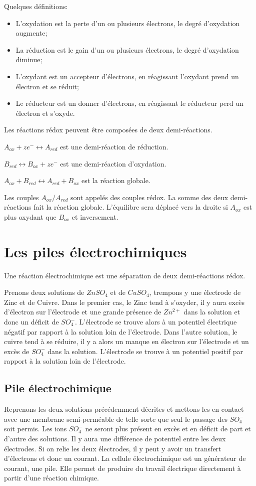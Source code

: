 Quelques définitions:

\begin{itemize}
  \item L'oxydation est la perte d'un ou plusieurs électrons,
    le degré d'oxydation augmente;
  \item La réduction est le gain d'un ou plusieurs électrons,
    le degré d'oxydation diminue;
  \item L'oxydant est un accepteur d'électrons,
    en réagissant l'oxydant prend un électron et se réduit;
  \item Le réducteur est un donner d'électrons,
    en réagissant le réducteur perd un électron et s'oxyde.
\end{itemize}

Les réactions rédox peuvent être composées de deux demi-réactions.

$A_{ox}+ze^- \leftrightarrow A_{red}$ est une demi-réaction de réduction.

$B_{red} \leftrightarrow B_{ox}+ze^-$ est une demi-réaction d'oxydation.

$A_{ox}+B_{red}\leftrightarrow A_{red}+B_{ox}$ est la réaction globale.

Les couples $A_{ox}/A_{red}$ sont appelés des couples rédox.
La somme des deux demi-réactions fait la réaction globale.
L'équilibre sera déplacé vers la droite si $A_{ox}$ est
plus oxydant que $B_{ox}$ et inversement.

\section{Les piles électrochimiques}
Une réaction électrochimique est une séparation de deux demi-réactions rédox.

Prenons deux solutions de $ZnSO_4$ et de $CuSO_4$,
trempons y une électrode de Zinc et de Cuivre.
Dans le premier cas, le Zinc tend à s'oxyder,
il y aura excès d'électron sur l'électrode et une grande présence de $Zn^{2+}$
dans la solution et donc un déficit de $SO_4^-$.
L'électrode se trouve alors à un potentiel électrique négatif
par rapport à la solution loin de l'électrode.
Dans l'autre solution, le cuivre tend à se réduire,
il y a alors un manque en électron sur l'électrode et
un excès de $SO_4^-$ dans la solution.
L'électrode se trouve à un potentiel positif
par rapport à la solution loin de l'électrode.

\subsection{Pile électrochimique}
Reprenons les deux solutions précédemment décrites et mettons les en contact
avec une membrane semi-perméable de telle sorte que
seul le passage des $SO_4^-$ soit permis.
Les ions $SO_4^-$ ne seront plus présent en excès et
en déficit de part et d'autre des solutions.
Il y aura une différence de potentiel entre les deux électrodes.
Si on relie les deux électrodes,
il y peut y avoir un transfert d'électrons et donc un courant.
La cellule électrochimique est un générateur de courant, une pile.
Elle permet de produire du travail électrique directement
à partir d'une réaction chimique.

